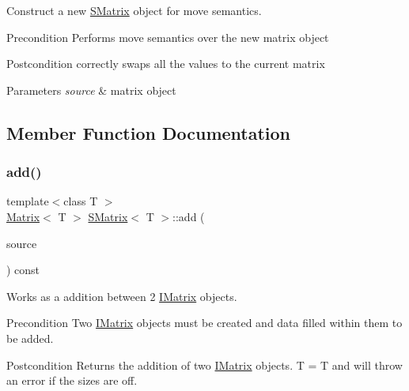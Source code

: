 Construct a new \mbox{\hyperlink{class_s_matrix}{S\+Matrix}} object for move semantics. 

\begin{DoxyPrecond}{Precondition}
Performs move semantics over the new matrix object 
\end{DoxyPrecond}
\begin{DoxyPostcond}{Postcondition}
correctly swaps all the values to the current matrix 
\end{DoxyPostcond}

\begin{DoxyParams}{Parameters}
{\em source} & matrix object \\
\hline
\end{DoxyParams}


\subsection{Member Function Documentation}
\mbox{\label{class_s_matrix_a1e1a79da5af6b1f7332afb26b391acbe}} 
\subsubsection{\texorpdfstring{add()}{add()}\hspace{0.1cm}{\footnotesize\ttfamily [1/6]}}
{\footnotesize\ttfamily template$<$class T $>$ \\
\mbox{\hyperlink{class_matrix}{Matrix}}$<$ T $>$ \mbox{\hyperlink{class_s_matrix}{S\+Matrix}}$<$ T $>$\+::add (\begin{DoxyParamCaption}\item[{const \mbox{\hyperlink{class_i_matrix}{I\+Matrix}}$<$ \mbox{\hyperlink{class_matrix}{Matrix}}$<$ T $>$, T $>$ \&}]{source }\end{DoxyParamCaption}) const}



Works as a addition between 2 \mbox{\hyperlink{class_i_matrix}{I\+Matrix}} objects. 

\begin{DoxyPrecond}{Precondition}
Two \mbox{\hyperlink{class_i_matrix}{I\+Matrix}} objects must be created and data filled within them to be added. 
\end{DoxyPrecond}
\begin{DoxyPostcond}{Postcondition}
Returns the addition of two \mbox{\hyperlink{class_i_matrix}{I\+Matrix}} objects. T = T and will throw an error if the sizes are off.
\end{DoxyPostcond}

